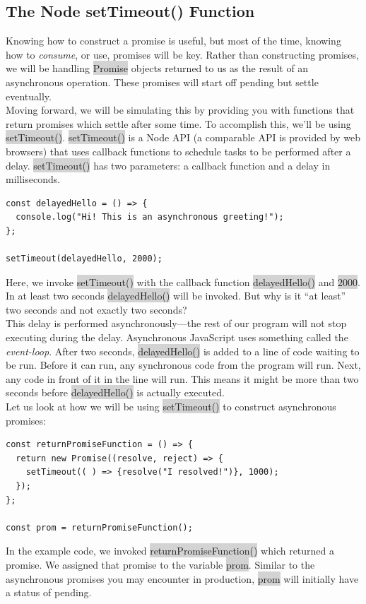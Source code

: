 \documentclass[11pt]{article}
\begin{document}
\subsection{The Node setTimeout() Function}
Knowing how to construct a promise is useful, but most of the time, knowing how to \textit{consume}, or use, promises will be key. Rather than constructing promises, we will be handling \colorbox{lightgray}{Promise} objects returned to us as the result of an asynchronous operation. These promises will start off pending but settle eventually. \\
\newline
Moving forward, we will be simulating this by providing you with functions that return promises which settle after some time. To accomplish this, we’ll be using \colorbox{lightgray}{setTimeout()}. \colorbox{lightgray}{setTimeout()} is a Node API (a comparable API is provided by web browsers) that uses callback functions to schedule tasks to be performed after a delay. \colorbox{lightgray}{setTimeout()} has two parameters: a callback function and a delay in milliseconds.
\begin{lstlisting}
const delayedHello = () => {
  console.log("Hi! This is an asynchronous greeting!");
};

setTimeout(delayedHello, 2000);
\end{lstlisting}
Here, we invoke \colorbox{lightgray}{setTimeout()} with the callback function \colorbox{lightgray}{delayedHello()} and \colorbox{lightgray}{2000}. In at least two seconds \colorbox{lightgray}{delayedHello()} will be invoked. But why is it “at least” two seconds and not exactly two seconds? \\
\newline
This delay is performed asynchronously—the rest of our program will not stop executing during the delay. Asynchronous JavaScript uses something called the \textit{event-loop}. After two seconds, \colorbox{lightgray}{delayedHello()} is added to a line of code waiting to be run. Before it can run, any synchronous code from the program will run. Next, any code in front of it in the line will run. This means it might be more than two seconds before \colorbox{lightgray}{delayedHello()} is actually executed. \\
\newline
Let us look at how we will be using \colorbox{lightgray}{setTimeout()} to construct asynchronous promises:
\begin{lstlisting}
const returnPromiseFunction = () => {
  return new Promise((resolve, reject) => {
    setTimeout(( ) => {resolve("I resolved!")}, 1000);
  });
};

const prom = returnPromiseFunction();
\end{lstlisting}
In the example code, we invoked \colorbox{lightgray}{returnPromiseFunction()} which returned a promise. We assigned that promise to the variable \colorbox{lightgray}{prom}. Similar to the asynchronous promises you may encounter in production, \colorbox{lightgray}{prom} will initially have a status of pending.
\end{document}
